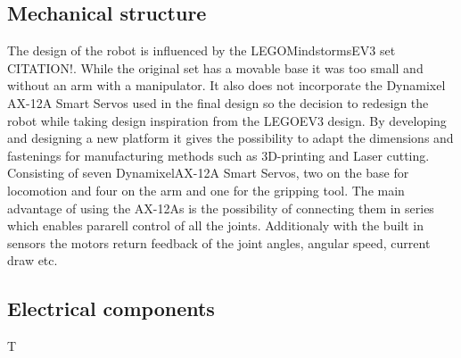 
\subsection{Mechanical structure}
The design of the robot is influenced by the LEGO\textregistered Mindstorms\textregistered EV3 set CITATION!. While the original set has a movable base it was too small and without an arm with a manipulator. It also does not incorporate the Dynamixel AX-12A Smart Servos used in the final design so the decision to redesign the robot while taking design inspiration from the LEGO\textregistered EV3 design. By developing and designing a new platform it gives the possibility to adapt the dimensions and fastenings for manufacturing methods such as 3D-printing and Laser cutting. 
Consisting of seven Dynamixel\textregistered AX-12A Smart Servos, two on the base for locomotion and four on the arm and one for the gripping tool. The main advantage of using the AX-12As is the possibility of connecting them in series which enables pararell control of all the joints. Additionaly with the built in sensors the motors return feedback of the joint angles, angular speed, current draw etc. 
\subsection{Electrical components}
T



